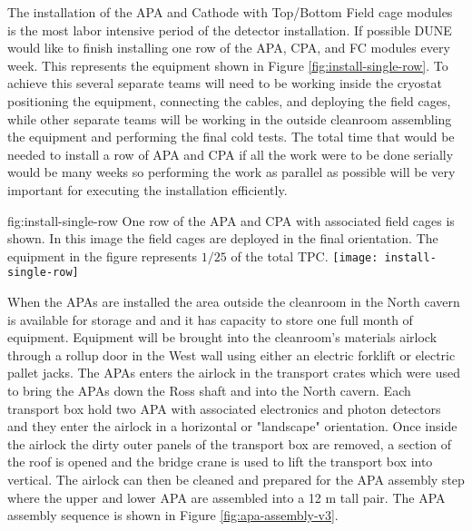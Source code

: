 The installation of the APA and Cathode with Top/Bottom Field cage modules is the most labor intensive period of the detector installation. If possible DUNE would like to finish installing one row of the APA, CPA, and FC modules every week. This represents the equipment shown in Figure \ref{fig:install-single-row}. To achieve this several separate teams will need to be working inside the cryostat positioning the equipment, connecting the cables, and deploying the field cages, while  other separate teams will be working in the outside cleanroom assembling the equipment and performing the final cold tests. The total time that would be needed to install a row of APA and CPA if all the work were to be done serially would be many weeks so performing the work as parallel  as possible will be very important for executing the installation efficiently. 


\begin{dunefigure}{fig:install-single-row}
{One row of the APA and CPA with associated field cages is shown. In this  image the field cages are deployed in the final orientation. The equipment in the figure represents $1/25$ of the total TPC.}
 \texttt{[image: install-single-row]}
\end{dunefigure}

When the APAs are installed the area outside the cleanroom in the North cavern is available for storage and and it has capacity to store one full month of equipment. Equipment will be brought into the cleanroom's materials airlock through a rollup door in the West wall using either an electric forklift or electric pallet jacks.  The APAs enters the airlock in the transport crates which were used to bring the APAs down the Ross shaft and into the North cavern. Each transport box hold two APA with associated electronics and photon detectors and they enter the airlock in a horizontal or "landscape" orientation. Once inside the airlock the dirty outer panels of the transport box are removed, a section of the roof is opened and the bridge crane is used to lift the transport box into vertical. The airlock can then be cleaned and prepared for the APA assembly step where the upper and lower APA are assembled into a 12 \si{m} tall pair. The APA assembly sequence is shown in Figure \ref{fig:apa-assembly-v3}.


